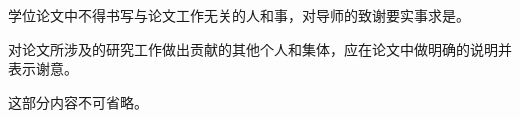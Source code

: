 
\begin{acknowledgment}

学位论文中不得书写与论文工作无关的人和事，对导师的致谢要实事求是。

对论文所涉及的研究工作做出贡献的其他个人和集体，应在论文中做明确的说明并表示谢意。

这部分内容不可省略。

\end{acknowledgment}


